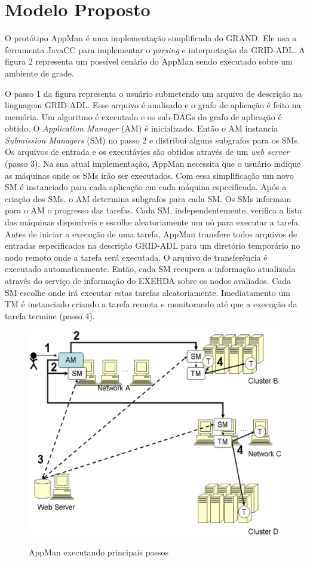 \section{Modelo Proposto}
\label{cap:modelo proposto}


O protótipo AppMan é uma implementação simplificada do GRAND. Ele usa a ferramenta JavaCC para implementar o {\it parsing} e interpretação da GRID-ADL. A figura 2 representa um possível cenário do AppMan sendo executado sobre um ambiente de grade.

O passo 1 da figura representa o usuário submetendo um arquivo de descrição na linguagem GRID-ADL. Esse arquivo é analisado e o grafo de aplicação é feito na memória. Um algoritmo é executado e os sub-DAGs do grafo de aplicação é obtido. O {\it Application Manager} (AM) é inicializado. Então o AM instancia {\it Submission Managers} (SM) no passo 2 e distribui alguns subgrafos para os SMs. Os arquivos de entrada e os executávies são obtidos através de um {\it web server} (passo 3). Na sua atual implementação, AppMan necessita que o usuário indique as máquinas onde os SMs irão ser executados. Com essa simplificação um novo SM é instanciado para cada aplicação em cada máquina especificada. Após a criação dos SMs, o AM determina subgrafos para cada SM. Os SMs informam para o AM o progresso das tarefas. Cada SM, independentemente, verifica a lista das máquinas disponíveis e escolhe aleatoriamente um nó para executar a tarefa. Antes de iniciar a execução de uma tarefa, AppMan transfere todos arquivos de entradas especificados na descrição GRID-ADL para um diretório temporário no nodo remoto onde a tarefa será executada. O arquivo de transferência é executado automaticamente. Então, cada SM recupera a informação atualizada através do serviço de informação do EXEHDA sobre os nodos avaliados. Cada SM escolhe onde irá executar estas tarefas aleatoriamente. Imediatamento um TM é instanciado criando a tarefa remota e monitorando até que a execução da tarefa termine (passo 4).

\begin{figure}[h]
\center
\includegraphics[scale=.2]{img/AppMan.eps}
\label{AppMan}
\caption{AppMan executando principais passos}
\end{figure}

